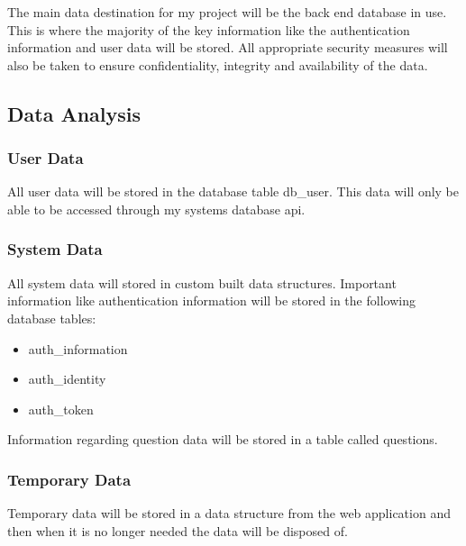 The main data destination for my project will be the back end database in use. This is where the majority of the key information like the authentication information and user data will be stored. All appropriate security measures will also be taken to ensure confidentiality, integrity and availability of the data.

\subsection{Data Analysis}
\subsubsection{User Data}

All user data will be stored in the database table db\_user. This data will only be able to be accessed through my systems database api. 

\subsubsection{System Data}

All system data will stored in custom built data structures. Important information like authentication information will be stored in the following database tables:

\begin{itemize}
\item{auth\_information}
\item{auth\_identity}
\item{auth\_token}
\end{itemize}

Information regarding question data will be stored in a table called questions.

\subsubsection{Temporary Data}

Temporary data will be stored in a data structure from the web application and then when it is no longer needed the data will be disposed of.



